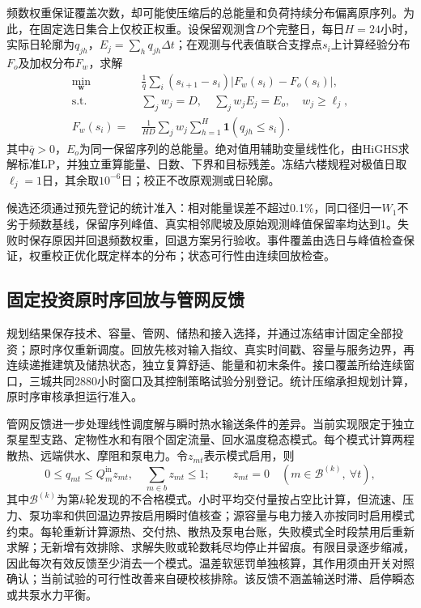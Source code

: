 频数权重保证覆盖次数，却可能使压缩后的总能量和负荷持续分布偏离原序列。为此，在固定选日集合上仅校正权重。设保留观测含$D$个完整日，每日$H=24$小时，实际日轮廓为$q_{jh}$，$E_j=\sum_hq_{jh}\Delta t$；在观测与代表值联合支撑点$s_i$上计算经验分布$F_o$及加权分布$F_w$，求解
\begin{equation}
\begin{aligned}
\min_{\boldsymbol w}\;&\frac{1}{\bar q}\sum_i(s_{i+1}-s_i)
       |F_w(s_i)-F_o(s_i)|,\\
\text{s.t.}\;&\sum_jw_j=D,\quad \sum_jw_jE_j=E_o,\quad w_j\geq\ell_j,\\
F_w(s_i)=\;&\frac{1}{HD}\sum_jw_j\sum_{h=1}^{H}\mathbf1(q_{jh}\leq s_i).
\end{aligned}
\label{eq:scoring-hard-w1}
\end{equation}
其中$\bar q>0$，$E_o$为同一保留序列的总能量。绝对值用辅助变量线性化，由HiGHS求解标准LP，并独立重算能量、日数、下界和目标残差。冻结六楼规程对极值日取$\ell_j=1$日，其余取$10^{-6}$日；校正不改原观测或日轮廓。

候选还须通过预先登记的统计准入：相对能量误差不超过0.1\%，同口径归一$W_1$不劣于频数基线，保留序列峰值、真实相邻爬坡及原始观测峰值保留率均达到1。失败时保存原因并回退频数权重，回退方案另行验收。事件覆盖由选日与峰值检查保证，权重校正优化既定样本的分布；状态可行性由连续回放检查。

\subsection{固定投资原时序回放与管网反馈}

规划结果保存技术、容量、管网、储热和接入选择，并通过冻结审计固定全部投资；原时序仅重新调度。回放先核对输入指纹、真实时间戳、容量与服务边界，再连续递推建筑及储热状态，独立复算舒适、能量和初末条件。接口覆盖所给连续窗口，三城共同2880小时窗口及其控制策略试验分别登记。统计压缩承担规划计算，原时序审核承担运行准入。

管网反馈进一步处理线性调度解与瞬时热水输送条件的差异。当前实现限定于独立泵星型支路、定物性水和有限个固定流量、回水温度稳态模式。每个模式计算两程散热、远端供水、摩阻和泵电力。令$z_{mt}$表示模式启用，则
\begin{equation}
0\leq q_{mt}\leq Q_m^{\mathrm{in}}z_{mt},\quad
\sum_{m\in b}z_{mt}\leq1;
\qquad z_{mt}=0\quad(m\in\mathcal B^{(k)},\ \forall t),
\label{eq:scoring-network-cut}
\end{equation}
其中$\mathcal B^{(k)}$为第$k$轮发现的不合格模式。小时平均交付量按占空比计算，但流速、压力、泵功率和供回温边界按启用瞬时值核查；源容量与电力接入亦按同时启用模式约束。每轮重新计算源热、交付热、散热及泵电台账，失败模式全时段禁用后重新求解；无新增有效排除、求解失败或轮数耗尽均停止并留痕。有限目录逐步缩减，因此每次有效反馈至少消去一个模式。温差软惩罚单独核算，其作用须由开关对照确认；当前试验的可行性改善来自硬校核排除。该反馈不涵盖输送时滞、启停瞬态或共泵水力平衡。

